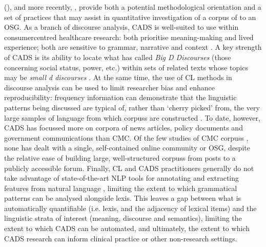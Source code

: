  (), and more recently, , provide both a potential methodological orientation and a set of practices that may assist in quantitative investigation of a \gls{corpus} of  to an \gls{OSG}. As a branch of discourse analysis, \gls{CADS} is well\hyp{}suited to use within \gls{consumercentred} healthcare research: both prioritise meaning\hyp{}making and lived experience; both are sensitive to grammar, narrative and context \cite{crawford_language_2013,partington_corpora_2004}. A key strength of \gls{CADS} is its ability to locate what \textcite{gee_social_2007} has called \emph{Big D Discourses} (those concerning social status, power, etc.) within sets of related texts whose topics may be \emph{small d discourses} \cite[about particular things and events in the world; see][]{baker_corpora_2013}. At the same time, the use of \gls{CL} methods in discourse analysis can be used to limit researcher bias and enhance reproducibility: frequency information can demonstrate that the linguistic patterns being discussed are typical of, rather than `cherry picked' from, the very large samples of language from which \glspl{corpus} are constructed \cite{baker_acceptable_2012}. To date, however, \gls{CADS} has focussed more on corpora of news articles, policy documents and government communications than \gls{CMC}. Of the few studies of \gls{CMC} \glspl{corpus} \cite[e.g.][]{harvey_am_2007,harvey_disclosures_2012,prentice_using_2010}, none has dealt with a single, self\hyp{}contained online community or \gls{OSG}, despite the relative ease of building large, well\hyp{}structured \glspl{corpus} from \glspl{post} to a publicly accessible \gls{forum}. Finally, \gls{CL} and \gls{CADS} practitioners generally do not take advantage of state\hyp{}of\hyp{}the\hyp{}art \gls{NLP} tools for annotating and extracting features from natural language \cite{groom_corpora_2015}, limiting the extent to which grammatical patterns can be analysed alongside lexis. This leaves a gap between what is automatically quantifiable (i.e. lexis, and the adjacency of lexical items) and the linguistic strata of interest (meaning, discourse and semantics), limiting the extent to which \gls{CADS} can be automated, and ultimately, the extent to which \gls{CADS} research can inform clinical practice or other non\hyp{}research settings.


